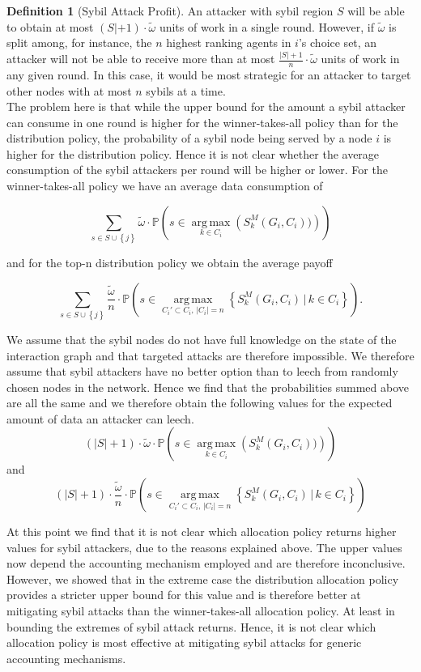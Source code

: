 \documentclass[11pt,a4paper]{article}
\theoremstyle{definition}
\newtheorem{definition}{Definition}[section]
\theoremstyle{theorem}
\theoremstyle{proposition}
\theoremstyle{corollary}
\theoremstyle{lemma}
\theoremstyle{example}
\theoremstyle{remark}
\DeclareMathOperator*{\argmax}{arg\,max}
\begin{document}
\begin{definition}[Sybil Attack Profit]
\noindent{}An attacker with sybil region $S$ will be able to obtain at most $(S|+1)\cdot{}\tilde{\omega}$ units of work in a single round. However, if $\tilde{\omega}$ is split among, for instance, the $n$ highest ranking agents in $i$'s choice set, an attacker will not be able to receive more than at most $\frac{|S|+1}{n}\cdot\tilde{\omega}$ units of work in any given round. In this case, it would be most strategic for an attacker to target other nodes with at most $n$ sybils at a time. \vspace{1em}\\ 

\noindent{}The problem here is that while the upper bound for the amount a sybil attacker can consume in one round is higher for the winner-takes-all policy than for the distribution policy, the probability of a sybil node being served by a node $i$ is higher for the distribution policy. Hence it is not clear whether the average consumption of the sybil attackers per round will be higher or lower. For the winner-takes-all policy we have an average data consumption of

\[
\sum\limits_{s\in{}S\cup\left\lbrace{}j\right\rbrace}\tilde{\omega}\cdot\mathbb{P}\left(s\in{}\argmax\limits_{k\in{}C_i}\left(S_k^M(G_i,C_i))\right)\right)
\] 

\noindent{}and for the top-n distribution policy we obtain the average payoff

\[
\sum\limits_{s\in{}S\cup\left\lbrace{}j\right\rbrace}\frac{\tilde{\omega}}{n}\cdot\mathbb{P}\left(s\in\argmax\limits_{C_i'\subset{}C_i,\,|C_i|=n}\left\lbrace{}S_k^M(G_i,C_i)\,|\,k\in{}C_i\right\rbrace\right).
\]

\noindent{}We assume that the sybil nodes do not have full knowledge on the state of the interaction graph and that targeted attacks are therefore impossible. We therefore assume that sybil attackers have no better option than to leech from randomly chosen nodes in the network. Hence we find that the probabilities summed above are all the same and we therefore obtain the following values for the expected amount of data an attacker can leech.
\[
(|S|+1)\cdot\tilde{\omega}\cdot\mathbb{P}\left(s\in{}\argmax\limits_{k\in{}C_i}\left(S_k^M(G_i,C_i))\right)\right)
\]
\noindent{}and
\[
(|S|+1)\cdot\frac{\tilde{\omega}}{n}\cdot\mathbb{P}\left(s\in\argmax\limits_{C_i'\subset{}C_i,\,|C_i|=n}\left\lbrace{}S_k^M(G_i,C_i)\,|\,k\in{}C_i\right\rbrace\right)
\]

\noindent{}At this point we find that it is not clear which allocation policy returns higher values for sybil attackers, due to the reasons explained above. The upper values now depend the accounting mechanism employed and are therefore inconclusive. However, we showed that in the extreme case the distribution allocation policy provides a stricter upper bound for this value and is therefore better at mitigating sybil attacks than the winner-takes-all allocation policy. At least in bounding the extremes of sybil attack returns. Hence, it is not clear which allocation policy is most effective at mitigating sybil attacks for generic accounting mechanisms.\vspace{1em}\\


\end{definition}
\end{document}
